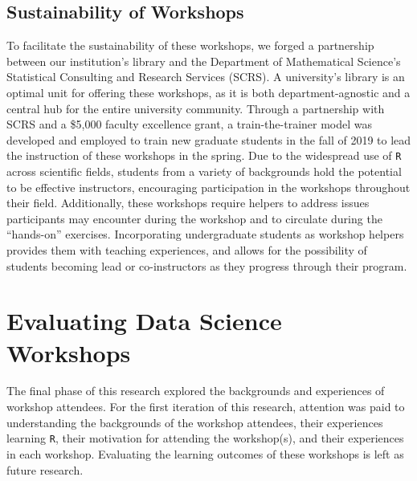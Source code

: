 \documentclass[12pt]{article}
\begin{document}


\subsection{Sustainability of Workshops}  

\quad To facilitate the sustainability of these workshops, we forged a partnership between our institution's library and the Department of Mathematical Science's Statistical Consulting and Research Services (SCRS). A university's library is an optimal unit for offering these workshops, as it is both department-agnostic and a central hub for the entire university community. Through a partnership with SCRS and a \$5,000 faculty excellence grant, a train-the-trainer model was developed and employed to train new graduate students in the fall of 2019 to lead the instruction of these workshops in the spring. Due to the widespread use of \texttt{R} across scientific fields, students from a variety of backgrounds hold the potential to be effective instructors,  encouraging participation in the workshops throughout their field. Additionally, these workshops require helpers to address issues participants may encounter during the workshop and to circulate during the ``hands-on'' exercises. Incorporating undergraduate students as workshop helpers provides them with teaching experiences, and allows for the possibility of students becoming lead or co-instructors as they progress through their program. 


\section{Evaluating Data Science Workshops}
\label{sec:implement}

\quad The final phase of this research explored the backgrounds and experiences of workshop attendees. For the first iteration of this research, attention was paid to understanding the backgrounds of the workshop attendees, their experiences learning \texttt{R}, their motivation for attending the workshop(s), and their experiences in each workshop. Evaluating the learning outcomes of these workshops is left as future research.  
\end{document}
